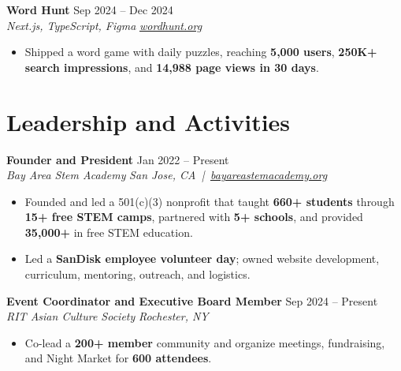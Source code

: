 \documentclass[10pt,letterpaper]{article}
\newcommand{\resumeRole}[4]{%
  \textbf{#1} \hfill #2\\
  \textit{#3} \hfill \textit{#4}
}
\newcommand{\majorGap}{\vspace{1pt plus 2fill}}
\newcommand{\entryGap}{\vspace{0pt plus 1fill}}
\begin{document}
\entryGap
\resumeRole{Word Hunt}{Sep 2024 -- Dec 2024}{Next.js, TypeScript, Figma}{\href{https://wordhunt.org}{wordhunt.org}}
\begin{itemize}
  \item Shipped a word game with daily puzzles, reaching \textbf{5,000 users}, \textbf{250K+ search impressions}, and \textbf{14,988 page views in 30 days}.
\end{itemize}

\majorGap
\section*{Leadership and Activities}
\resumeRole{Founder and President}{Jan 2022 -- Present}{Bay Area Stem Academy}{San Jose, CA \,|\, \href{https://bayareastemacademy.org}{bayareastemacademy.org}}
\begin{itemize}
  \item Founded and led a 501(c)(3) nonprofit that taught \textbf{660+ students} through \textbf{15+ free STEM camps}, partnered with \textbf{5+ schools}, and provided \textbf{\textdollar{}35,000+} in free STEM education.
  \item Led a \textbf{SanDisk employee volunteer day}; owned website development, curriculum, mentoring, outreach, and logistics.
\end{itemize}

\entryGap
\resumeRole{Event Coordinator and Executive Board Member}{Sep 2024 -- Present}{RIT Asian Culture Society}{Rochester, NY}
\begin{itemize}
  \item Co-lead a \textbf{200+ member} community and organize meetings, fundraising, and Night Market for \textbf{600 attendees}.
\end{itemize}
\end{document}
